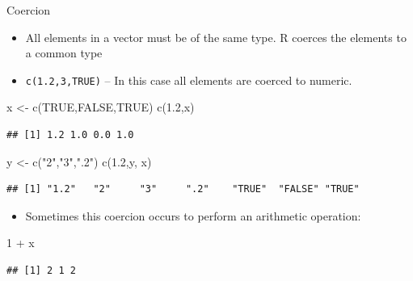 \documentclass[
  10pt,
  ignorenonframetext,
]{beamer}
\newenvironment{Shaded}{\begin{snugshade}}{\end{snugshade}}
\newcommand{\DecValTok}[1]{\textcolor[rgb]{0.86,0.86,0.80}{#1}}
\newcommand{\FloatTok}[1]{\textcolor[rgb]{0.75,0.75,0.82}{#1}}
\newcommand{\KeywordTok}[1]{\textcolor[rgb]{0.94,0.87,0.69}{#1}}
\newcommand{\NormalTok}[1]{\textcolor[rgb]{0.80,0.80,0.80}{#1}}
\newcommand{\OperatorTok}[1]{\textcolor[rgb]{0.94,0.94,0.82}{#1}}
\newcommand{\OtherTok}[1]{\textcolor[rgb]{0.94,0.94,0.56}{#1}}
\newcommand{\StringTok}[1]{\textcolor[rgb]{0.80,0.58,0.58}{#1}}
\providecommand{\tightlist}{%
  \setlength{\itemsep}{0pt}\setlength{\parskip}{0pt}}
\begin{document}
\begin{frame}[fragile]{Coercion}
\protect\hypertarget{coercion}{}

\begin{itemize}
\tightlist
\item
  All elements in a vector must be of the same type. R coerces the
  elements to a common type
\item
  \texttt{c(1.2,3,TRUE)} -- In this case all elements are coerced to
  numeric.
\end{itemize}

\begin{Shaded}
\begin{Highlighting}[]
\NormalTok{x <-}\StringTok{ }\KeywordTok{c}\NormalTok{(}\OtherTok{TRUE}\NormalTok{,}\OtherTok{FALSE}\NormalTok{,}\OtherTok{TRUE}\NormalTok{)}
\KeywordTok{c}\NormalTok{(}\FloatTok{1.2}\NormalTok{,x)}
\end{Highlighting}
\end{Shaded}

\begin{verbatim}
## [1] 1.2 1.0 0.0 1.0
\end{verbatim}

\begin{Shaded}
\begin{Highlighting}[]
\NormalTok{y <-}\StringTok{ }\KeywordTok{c}\NormalTok{(}\StringTok{"2"}\NormalTok{,}\StringTok{"3"}\NormalTok{,}\StringTok{".2"}\NormalTok{)}
\KeywordTok{c}\NormalTok{(}\FloatTok{1.2}\NormalTok{,y, x)}
\end{Highlighting}
\end{Shaded}

\begin{verbatim}
## [1] "1.2"   "2"     "3"     ".2"    "TRUE"  "FALSE" "TRUE"
\end{verbatim}

\begin{itemize}
\tightlist
\item
  Sometimes this coercion occurs to perform an arithmetic operation:
\end{itemize}

\begin{Shaded}
\begin{Highlighting}[]
\DecValTok{1} \OperatorTok{+}\StringTok{ }\NormalTok{x}
\end{Highlighting}
\end{Shaded}

\begin{verbatim}
## [1] 2 1 2
\end{verbatim}

\end{frame}
\end{document}
